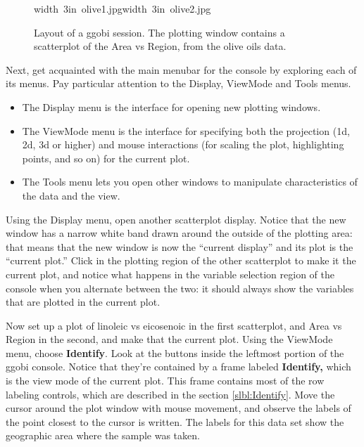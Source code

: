 \documentclass[11pt]{article}
\begin{document}
\begin{figure}[h]
\hbox{\pdfimage width 3in {olive1.jpg}\pdfimage width 3in {olive2.jpg}}
\caption{Layout of a ggobi session.  The plotting window contains a
scatterplot of the Area vs Region, from the olive oils data.
}%
\label{fig1}
\end{figure}

Next, get acquainted with the main menubar for the console by
exploring each of its menus.  Pay particular attention to the
Display, ViewMode and Tools menus.

\begin {itemize}
\item The Display menu is the interface for opening new plotting
  windows.
\item The ViewMode menu is the interface for specifying both the
  projection (1d, 2d, 3d or higher) and mouse interactions (for scaling
  the plot, highlighting points, and so on) for the current plot.
\item The Tools menu lets you open other windows to manipulate
  characteristics of the data and the view.
\end {itemize}

Using the Display menu, open another scatterplot display. Notice that
the new window has a narrow white band drawn around the outside of
the plotting area:  that means that the new window is now the
``current display'' and its plot is the ``current plot.''  Click in the
plotting region of the other scatterplot to make it the current plot,
and notice what happens in the variable selection region of the
console when you alternate between the two:  it should always show
the variables that are plotted in the current plot.

Now set up a plot of linoleic vs eicosenoic in the first scatterplot,
and Area vs Region in the second, and make that the current plot.
Using the ViewMode menu, choose {\bf Identify}. Look at the buttons
inside the leftmost portion of the ggobi console. Notice that
they're contained by a frame labeled {\bf Identify,} which is the
view mode of the current plot.  This frame contains most of the row
labeling controls, which are described in the section
\ref{slbl:Identify}. Move the cursor around the plot window with mouse
movement, and observe the labels of the point closest to the cursor is
written. The labels for this data set show the geographic area
where the sample was taken.
\end{document}
